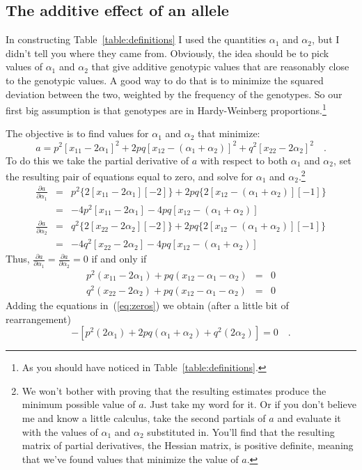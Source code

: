 \subsection*{The additive effect of an allele}

In constructing Table~\ref{table:definitions} I used the quantities
$\alpha_1$ and $\alpha_2$, but I didn't tell you where they came
from. Obviously, the idea should be to pick values of $\alpha_1$ and
$\alpha_2$ that give additive genotypic values that are reasonably
close to the genotypic values. A good way to do that is to minimize
the squared deviation between the two, weighted by the frequency of
the genotypes. So our first big assumption is that genotypes are in
Hardy-Weinberg proportions.\footnote{As you should have noticed in
  Table~\ref{table:definitions}.}

The objective is to find values for $\alpha_1$ and $\alpha_2$ that
minimize:
\[
a = p^2[x_{11}-2\alpha_1]^2
       + 2pq[x_{12}-(\alpha_1+\alpha_2)]^2
       + q^2[x_{22}-2\alpha_2]^2 \quad .
\]
To do this we take the partial derivative of $a$ with respect to both
$\alpha_1$ and $\alpha_2$, set the resulting pair of equations equal
to zero, and solve for $\alpha_1$ and $\alpha_2$.\footnote{We won't
  bother with proving that the resulting estimates produce the minimum
  possible value of $a$. Just take my word for it. Or if you don't
  believe me and know a little calculus, take the second partials of
  $a$ and evaluate it with the values of $\alpha_1$ and $\alpha_2$
  substituted in. You'll find that the resulting matrix of partial
  derivatives, the Hessian matrix, is positive definite, meaning that
  we've found values that minimize the value of $a$.}
\begin{eqnarray*}
\frac{\partial a}{\partial{\alpha_1}} &=& p^2\{2[x_{11} - 2\alpha_1][-2]\}
                     + 2pq\{2[x_{12} - (\alpha_1+\alpha_2)][-1]\} \\
                  &=& -4p^2[x_{11} - 2\alpha_1]
                     -4pq[x_{12} - (\alpha_1+\alpha_2)] \\
\frac{\partial a}{\partial{\alpha_2}} &=& q^2\{2[x_{22} - 2\alpha_2][-2]\}
                     + 2pq\{2[x_{12} - (\alpha_1+\alpha_2)][-1]\} \\
                  &=& -4q^2[x_{22} - 2\alpha_2]
                     -4pq[x_{12} - (\alpha_1+\alpha_2)] 
\end{eqnarray*}
Thus, $\frac{\partial a}{\partial{\alpha_1}} = \frac{\partial a}{\partial{\alpha_2}} = 0$ if and only if
\begin{eqnarray}
p^2(x_{11} - 2\alpha_1) + pq(x_{12} - \alpha_1 - \alpha_2) &=& 0
  \nonumber \\
q^2(x_{22} - 2\alpha_2) + pq(x_{12} - \alpha_1 - \alpha_2) &=& 0
\label{eq:zeros}
\end{eqnarray}
Adding the equations in~(\ref{eq:zeros}) we obtain (after a little bit
of rearrangement)
\begin{equation}
[p^2x_{11} + 2pqx_{12} + q^2x_{22}] -
   [p^2(2\alpha_1) + 2pq(\alpha_1 + \alpha_2) + q^2(2\alpha_2)] = 0 \quad .
\label{eq:basic}
\end{equation}


